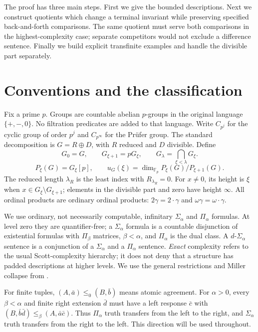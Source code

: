\documentclass[11pt]{article}
\begin{document}
The proof has three main steps. First we give the bounded descriptions.
Next we construct quotients which change a terminal invariant while
preserving specified back-and-forth comparisons. The same quotient must
serve both comparisons in the highest-complexity case; separate
competitors would not exclude a difference sentence. Finally we build
explicit transfinite examples and handle the divisible part separately.

\section{Conventions and the classification}
Fix a prime $p$. Groups are countable abelian $p$-groups in the original
language $\{+,-,0\}$. No filtration predicates are added to that language.
Write $C_{p^j}$ for the cyclic group of order $p^j$ and
$C_{p^\infty}$ for the Pr\"ufer group. The standard decomposition is
$G=R\oplus D$, with $R$ reduced and $D$ divisible. Define
\[
 G_0=G,\qquad G_{\xi+1}=pG_\xi,\qquad
 G_\lambda=\bigcap_{\xi<\lambda}G_\xi.
\]
\[
 P_\xi(G)=G_\xi[p],\qquad
 u_G(\xi)=\dim_{\mathbb F_p}P_\xi(G)/P_{\xi+1}(G).
\]
The reduced length $\lambda_R$ is the least index with $R_{\lambda_R}=0$.
For $x\ne0$, its height is $\xi$ when $x\in G_\xi\setminus G_{\xi+1}$;
elements in the divisible part and zero have height $\infty$.
All ordinal products are ordinary ordinal products:
$2\gamma=2\cdot\gamma$ and $\omega\gamma=\omega\cdot\gamma$.

We use ordinary, not necessarily computable, infinitary
$\Sigma_\alpha$ and $\Pi_\alpha$ formulas. At level zero they are
quantifier-free; a $\Sigma_\alpha$ formula is a countable disjunction
of existential formulas with $\Pi_\beta$ matrices, $\beta<\alpha$,
and $\Pi_\alpha$ is the dual class. A $d\text{-}\Sigma_\alpha$
sentence is a conjunction of a $\Sigma_\alpha$ and a $\Pi_\alpha$
sentence. \emph{Exact} complexity refers to the usual Scott-complexity
hierarchy; it does not deny that a structure has padded descriptions at
higher levels. We use the general restrictions and Miller collapse
from \cite[Theorems~1.6, 2.5 and 2.6]{AGHT}.

For finite tuples, $(A,\bar a)\leq_0(B,\bar b)$ means atomic agreement.
For $\alpha>0$, every $\beta<\alpha$ and finite right extension $\bar d$
must have a left response $\bar c$ with
$(B,\bar b\bar d)\leq_\beta(A,\bar a\bar c)$.
Thus $\Pi_\alpha$ truth transfers from the left to the right,
and $\Sigma_\alpha$ truth transfers from the right to the left.
This direction will be used throughout.
\end{document}
